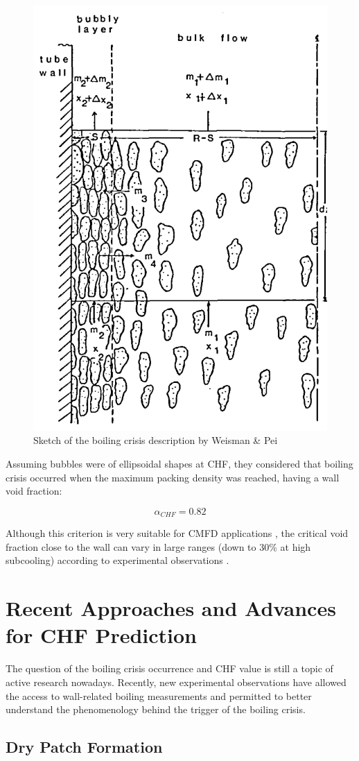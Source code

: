 \begin{figure}[!h]
\centering
\includegraphics[width=0.4\linewidth]{img/chf/chf_weisman.png}
\caption{Sketch of the boiling crisis description by Weisman \& Pei}
\label{fig:chf_weisman}
\end{figure}

\npar

Assuming bubbles were of ellipsoidal shapes at CHF, they considered that boiling crisis occurred when the maximum packing density was reached, \ie having a wall void fraction:

\begin{equation}
\alpha_{CHF} = 0.82
\end{equation} 

Although this criterion is very suitable for CMFD applications \cite{mimouni_computational_2016, liu_critical_2021}, the critical void fraction close to the wall can vary in large ranges (down to 30\% at high subcooling) according to experimental observations \cite{bruder_empirical_2018}.


\section{Recent Approaches and Advances for CHF Prediction}
\label{sec:new_chf}


The question of the boiling crisis occurrence and CHF value is still a topic of active research nowadays. Recently, new experimental observations have allowed the access to wall-related boiling measurements \cite{kossolapov_experimental_2021, richenderfer_experimental_2018, bloch_study_2016} and permitted to better understand the phenomenology behind the trigger of the boiling crisis.

\npar

\subsection{Dry Patch Formation}

